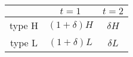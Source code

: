 \documentclass[]{standalone}
\begin{document}
\begin{tabular}{c| c| c}
 & $t=1$ & $t=2$ \\
 \hline
 type H & $(1+\delta)H$ & $\delta H$ \\
 \hline
type L & $(1+\delta)L$ & $\delta L$
\end{tabular}
\end{document}
